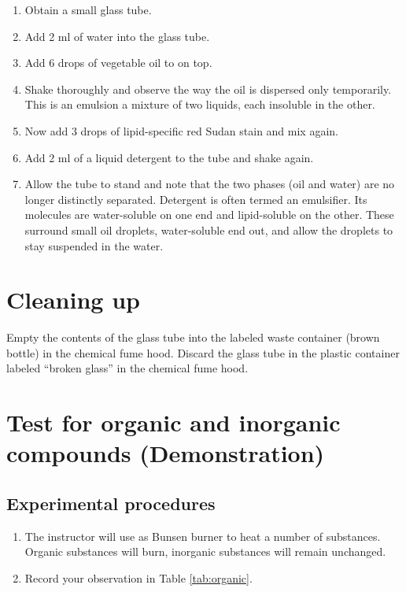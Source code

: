 \documentclass[]{book}
\providecommand{\tightlist}{%
  \setlength{\itemsep}{0pt}\setlength{\parskip}{0pt}}
\theoremstyle{definition}
\theoremstyle{definition}
\theoremstyle{definition}
\theoremstyle{remark}
\begin{document}
\begin{enumerate}
\def\labelenumi{\arabic{enumi}.}
\tightlist
\item
  Obtain a small glass tube.
\item
  Add 2 ml of water into the glass tube.
\item
  Add 6 drops of vegetable oil to on top.
\item
  Shake thoroughly and observe the way the oil is dispersed only
  temporarily. This is an emulsion a mixture of two liquids, each
  insoluble in the other.
\item
  Now add 3 drops of lipid-specific red Sudan stain and mix again.
\item
  Add 2 ml of a liquid detergent to the tube and shake again.
\item
  Allow the tube to stand and note that the two phases (oil and water)
  are no longer distinctly separated. Detergent is often termed an
  emulsifier. Its molecules are water-soluble on one end and
  lipid-soluble on the other. These surround small oil droplets,
  water-soluble end out, and allow the droplets to stay suspended in the
  water.
\end{enumerate}

\section{Cleaning up}\label{cleaning-up-1}

Empty the contents of the glass tube into the labeled waste container
(brown bottle) in the chemical fume hood. Discard the glass tube in the
plastic container labeled ``broken glass'' in the chemical fume hood.

\section{Test for organic and inorganic compounds
(Demonstration)}\label{test-for-organic-and-inorganic-compounds-demonstration}

\subsection{Experimental procedures}\label{experimental-procedures-5}

\begin{enumerate}
\def\labelenumi{\arabic{enumi}.}
\tightlist
\item
  The instructor will use as Bunsen burner to heat a number of
  substances. Organic substances will burn, inorganic substances will
  remain unchanged.
\item
  Record your observation in Table \ref{tab:organic}.
\end{enumerate}
\end{document}
